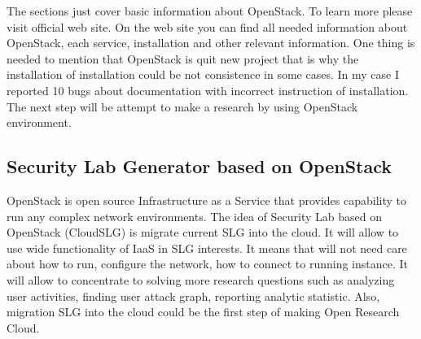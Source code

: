 The sections just cover basic information about OpenStack. To learn more please visit official web site. On the web site you can find all needed information about OpenStack, each service, installation and other relevant information. One thing is needed to mention that OpenStack is quit new project that is why the installation of installation could be not consistence in some cases. In my case I reported 10 bugs about documentation with incorrect instruction of installation.
The next step will be attempt to make a research by using OpenStack environment. 



\subsection{Security Lab Generator based on OpenStack}
OpenStack is open source Infrastructure as a Service that provides capability to run any complex network environments. The idea of Security Lab based on OpenStack (CloudSLG) is migrate current SLG into the cloud. It will allow to use wide functionality of IaaS in SLG interests. It means that will not need care about how to run, configure the network, how to connect to running instance. It will allow to concentrate to solving more research questions such as analyzing user activities, finding user attack graph, reporting analytic statistic. Also, migration SLG into the cloud could be the first step of making Open Research Cloud.    





% 